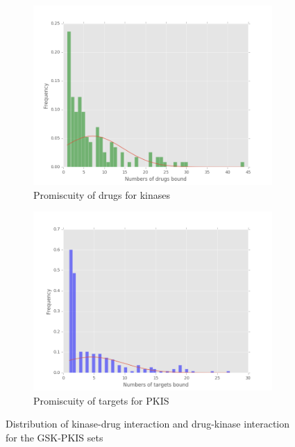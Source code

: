 \documentclass[a4paper, 11pt]{report}
\begin{document}
\begin{figure}[H]
\centering
\begin{subfigure}{.6\textwidth}
  \centering
  \includegraphics[width=\linewidth]{figures/numb_drugs.png}
  \caption{Promiscuity of drugs for kinases}
  \label{targ_drugdis}
\end{subfigure}%
\begin{subfigure}{.6\textwidth}
  \centering
  \includegraphics[width=\linewidth]{figures/num_target.png}
    \caption{Promiscuity of targets for PKIS}
  \label{drugtarg}
\end{subfigure}
\caption{Distribution of kinase-drug interaction and drug-kinase interaction for the GSK-PKIS sets}
\label{targ_dis}
\end{figure}
\end{document}
